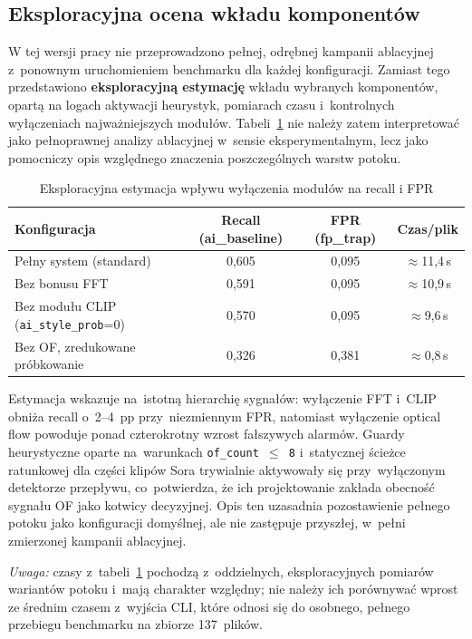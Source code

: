 \subsection*{Eksploracyjna ocena wkładu komponentów}
W tej wersji pracy nie przeprowadzono pełnej, odrębnej kampanii ablacyjnej
z~ponownym uruchomieniem benchmarku dla każdej konfiguracji. Zamiast tego
przedstawiono \textbf{eksploracyjną estymację} wkładu wybranych komponentów,
opartą na logach aktywacji heurystyk, pomiarach czasu i~kontrolnych wyłączeniach
najważniejszych modułów. Tabeli~\ref{tab:ablation} nie należy zatem interpretować
jako pełnoprawnej analizy ablacyjnej w~sensie eksperymentalnym, lecz jako
pomocniczy opis względnego znaczenia poszczególnych warstw potoku.
\begin{table}[h]
\centering
\caption{Eksploracyjna estymacja wpływu wyłączenia modułów na recall i FPR}
\label{tab:ablation}
\begin{tabular}{lccc}
\hline
\textbf{Konfiguracja} & \textbf{Recall (ai\_baseline)} & \textbf{FPR (fp\_trap)} & \textbf{Czas/plik} \\
\hline
Pełny system (standard) & 0{,}605 & 0{,}095 & $\approx$11{,}4\,s \\
Bez bonusu FFT & 0{,}591 & 0{,}095 & $\approx$10{,}9\,s \\
Bez modułu CLIP (\texttt{ai\_style\_prob}=0) & 0{,}570 & 0{,}095 & $\approx$9{,}6\,s \\
Bez OF, zredukowane próbkowanie & 0{,}326 & 0{,}381 & $\approx$0{,}8\,s \\
\hline
\end{tabular}
\end{table}
Estymacja wskazuje na~istotną hierarchię sygnałów: wyłączenie FFT i~CLIP obniża recall
o~2--4~pp przy~niezmiennym FPR, natomiast wyłączenie optical flow powoduje
ponad czterokrotny wzrost fałszywych alarmów. Guardy heurystyczne oparte na~warunkach
\texttt{of\_count~$\leq$~8} i~statycznej ścieżce ratunkowej dla części klipów Sora trywialnie aktywowały
się przy~wyłączonym detektorze przepływu, co~potwierdza, że ich projektowanie zakłada
obecność sygnału OF jako kotwicy decyzyjnej.
Opis ten uzasadnia pozostawienie pełnego potoku jako konfiguracji domyślnej,
ale nie zastępuje przyszłej, w~pełni zmierzonej kampanii ablacyjnej.

\noindent\textit{Uwaga:} czasy z~tabeli~\ref{tab:ablation} pochodzą z~oddzielnych,
eksploracyjnych pomiarów wariantów potoku i~mają charakter względny; nie należy ich
porównywać wprost ze średnim czasem z~wyjścia CLI, które odnosi się do osobnego,
pełnego przebiegu benchmarku na zbiorze 137~plików.

